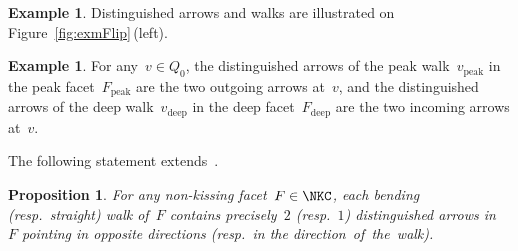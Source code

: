 \documentclass{amsart}
\newtheorem{proposition}[theorem]{Proposition}
\theoremstyle{definition}
\newtheorem{example}[theorem]{Example}
\newcommand{\fref}[1]{Figure~\ref{#1}} %
\newcommand{\peak}{\mathrm{peak}} %
\newcommand{\deep}{\mathrm{deep}} %
\begin{document}
\begin{example}
Distinguished arrows and walks are illustrated on \fref{fig:exmFlip}\,(left).
\end{example}

\begin{example}
For any~$v \in Q_0$, the distinguished arrows of the peak walk~$v_\peak$ in the peak facet~$F_\peak$ are the two outgoing arrows at~$v$, and the distinguished arrows of the deep walk~$v_\deep$ in the deep facet~$F_\deep$ are the two incoming arrows at~$v$.
\end{example}

The following statement extends~\cite[Thm.~3.2]{McConville}.

\begin{proposition}
\label{prop:distinguishedArrows}
For any non-kissing facet~$F \in \NKC$, each bending (resp.~straight) walk of~$F$ contains precisely~$2$ (resp.~$1$) distinguished arrows in~$F$ pointing in opposite directions (resp.~in the direction~of~the~walk).
\end{proposition}
\end{document}
